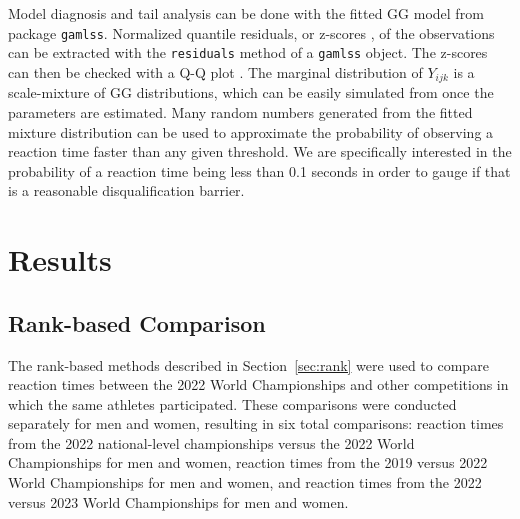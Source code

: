 \documentclass[12pt, letterpaper]{article}
\begin{document}
Model diagnosis and tail analysis can be done with the fitted GG model
from package \texttt{gamlss}. Normalized quantile residuals, or
z-scores \citep{dunn1996randomized}, of the observations can be
extracted with the \texttt{residuals} method of a \texttt{gamlss}
object. The z-scores can then be checked with a Q-Q plot
\citep{almeida2018ggplot2}. The marginal
distribution of $Y_{ijk}$ is a scale-mixture of GG distributions, which can be
easily simulated from once the parameters are estimated. Many
random numbers generated from the fitted mixture distribution can be used to
approximate the probability of observing a reaction time faster than any given
threshold. We are specifically interested in the probability of a reaction time
being less than 0.1 seconds in order to gauge if that is a reasonable 
disqualification barrier.



\section{Results} \label{sec:Results}

\subsection{Rank-based Comparison} \label{subsec:Results_Rank}

The rank-based methods described in Section~\ref{sec:rank} were used to 
compare reaction times between the 2022 World Championships and other 
competitions in which the same athletes participated. These comparisons 
were conducted separately for men and women, resulting in six total 
comparisons: reaction times from the 2022 national-level championships 
versus the 2022 World Championships for men and women, reaction times 
from the 2019 versus 2022 World Championships for men and women, and 
reaction times from the 2022 versus 2023 World Championships for men and 
women.
\end{document}
